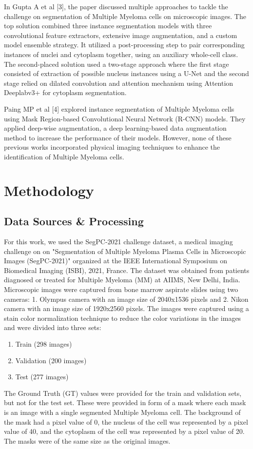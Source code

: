 \documentclass{article}
\begin{document}
In Gupta A et al [3], the paper discussed multiple approaches to tackle the challenge on segmentation of Multiple Myeloma cells on microscopic images. The top solution combined three instance segmentation models with three convolutional feature extractors, extensive image augmentation, and a custom model ensemble strategy. It utilized a post-processing step to pair corresponding instances of nuclei and cytoplasm together, using an auxiliary whole-cell class. The second-placed solution used a two-stage approach where the first stage consisted of extraction of possible nucleus instances using a U-Net and the second stage relied on dilated convolution and attention mechanism using Attention Deeplabv3+ for cytoplasm segmentation.

Paing MP et al [4] explored instance segmentation of Multiple Myeloma cells using Mask Region-based Convolutional Neural Network (R-CNN) models. They applied deep-wise augmentation, a deep learning-based data augmentation method to increase the performance of their models. However, none of these previous works incorporated physical imaging techniques to enhance the identification of Multiple Myeloma cells.

\section{Methodology}
\subsection{Data Sources \& Processing}
For this work, we used the SegPC-2021 challenge dataset, a medical imaging challenge on on "Segmentation of Multiple Myeloma Plasma Cells in Microscopic Images (SegPC-2021)" organized at the IEEE International Symposium on Biomedical Imaging (ISBI), 2021, France. The dataset was obtained from patients diagnosed or treated for Multiple Myeloma (MM) at AIIMS, New Delhi, India. Microscopic images were captured from bone marrow aspirate slides using two cameras: 1. Olympus camera with an image size of 2040x1536 pixels and 2. Nikon camera with an image size of 1920x2560 pixels. The images were captured using a stain color normalization technique to reduce the color variations in the images and were divided into three sets:
\begin{enumerate}
  \item Train (298 images)
  \item Validation (200 images)
  \item Test (277 images)
\end{enumerate}
The Ground Truth (GT) values were provided for the train and validation sets, but not for the test set. These were provided in form of a mask where each mask is an image with a single segmented Multiple Myeloma cell. The background of the mask had a pixel value of 0, the nucleus of the cell was represented by a pixel value of 40, and the cytoplasm of the cell was represented by a pixel value of 20. The masks were of the same size as the original images.
\end{document}
